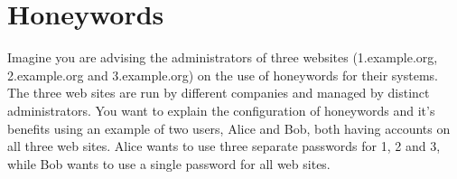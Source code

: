 
\graphicspath{ {./src/} } 
\usepackage{hyperref}
\usepackage{tikz}
\usetikzlibrary{mindmap}

\newcommand{\dozent}{Volker Roth}
\newcommand{\tutor}{Oliver Wiese}
\newcommand{\tutoriumNo}{02\\Materialien: Latex, VSC, Skript}
\newcommand{\ubungNo}{08}
\newcommand{\veranstaltung}{Rechnersicherheit}
\newcommand{\semester}{SoSe 21}




\section{Honeywords}
Imagine you are advising the administrators of three websites (1.example.org, 2.example.org and 3.example.org) on the use of honeywords for their systems. The three web sites are run by different companies and managed by distinct administrators. You want to explain the configuration of honeywords and it’s benefits using an example of two users, Alice and Bob, both having accounts on all three web sites. Alice wants to use three separate passwords for 1, 2 and 3, while Bob wants to use a single password for all web sites.


